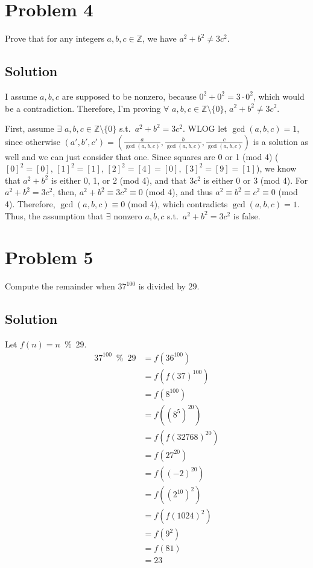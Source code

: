 \documentclass[fleqn]{article}
\begin{document}
    \section{Problem 4}
    Prove that for any integers $a, b, c \in \mathbb{Z}$, we have $a^2 + b^2 \neq 3c^2$.
        
        \subsection{Solution}
        I assume $a, b, c$ are supposed to be nonzero, because $0^2 + 0^2 = 3 \cdot 0^2$, which would be a contradiction.  Therefore, I'm proving $\forall$ $a, b, c \in \mathbb{Z} \setminus \{0\}$, $a^2 + b^2 \neq 3c^2$.
        
        First, assume $\exists$ $a, b, c \in \mathbb{Z} \setminus \{0\}$ s.t.\ $a^2 + b^2 = 3c^2$.  WLOG let $\gcd(a, b, c) = 1$, since otherwise $(a', b', c') = \left(\frac{a}{\gcd(a, b, c)}, \frac{b}{\gcd(a, b, c)}, \frac{c}{\gcd(a, b, c)}\right)$ is a solution as well and we can just consider that one.  Since squares are 0 or 1 (mod 4) ($[0]^2 = [0]$, $[1]^2 = [1]$, $[2]^2 = [4] = [0]$, $[3]^2 = [9] = [1]$), we know that $a^2 + b^2$ is either 0, 1, or 2 (mod 4), and that $3c^2$ is either 0 or 3 (mod 4).  For $a^2 + b^2 = 3c^2$, then, $a^2 + b^2 \equiv 3c^2 \equiv 0$ (mod 4), and thus $a^2 \equiv b^2 \equiv c^2 \equiv 0$ (mod 4).  Therefore, $\gcd(a, b, c) \equiv 0$ (mod 4), which contradicts $\gcd(a, b, c) = 1$.  Thus, the assumption that $\exists$ nonzero $a, b, c$ s.t.\ $a^2 + b^2 = 3c^2$ is false.
        
    \section{Problem 5}
    Compute the remainder when $37^{100}$ is divided by $29$.
        
        \subsection{Solution}
        Let $f(n) = n \enspace \% \enspace 29$.
        \begin{align}
               37^{100} \enspace \%\enspace 29
            &= f(36^{100}) \\
            &= f(f(37)^{100}) \\
            &= f(8^{100}) \\
            &= f((8^5)^{20}) \\
            &= f(f(32768)^{20}) \\
            &= f(27^{20}) \\
            &= f((-2)^{20}) \\
            &= f((2^{10})^2) \\
            &= f(f(1024)^2) \\
            &= f(9^2) \\
            &= f(81) \\
            &= 23
        \end{align}
        
\end{document}
